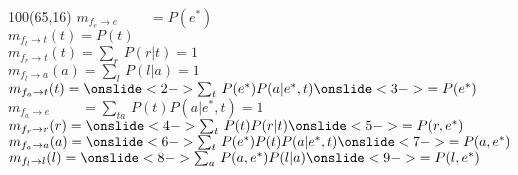 \documentclass[shownotes,aspectratio=169]{beamer}
\begin{document}
\begin{frame}[plain]
\begin{textblock}{100}(65,16)
 $m_{f_e\rightarrow e}\phantom{(e)} = P(e^*) $  \\
 $m_{f_t\rightarrow t}(t) = P(t)$  \\
 $m_{f_r\rightarrow t}(t) = \sum_r \, P(r|t) = 1$  \\
 $m_{f_l\rightarrow a}(a) = \sum_l \, P(l|a) = 1 $  \\
 $m_{f_a\rightarrow t}(t) = \onslide<2->{\sum_{t} \, P(e^*) P(a|e^*,t)} \onslide<3->{= P(e^*)}$  \\
 $m_{f_a\rightarrow e}\phantom{(e)} = \sum_{ta} \, P(t) P(a|e^*,t) = 1$  \\
 $m_{f_r\rightarrow r}(r) = \onslide<4->{\sum_{t} \, P(t) P(r|t)} \onslide<5->{= P(r,e^*)}$ \\
 $m_{f_a\rightarrow a}(a) = \onslide<6->{\sum_{t} \, P(e^*)P(t)P(a|e^*,t)}\onslide<7->{  = P(a,e^*)}$  \\
 $m_{f_l\rightarrow l}(l) = \onslide<8->{\sum_{a} \, P(a,e^*) P(l|a)} \onslide<9->{ = P(l,e^*)}$
 \end{textblock}

 





 
\end{frame}
\end{document}
